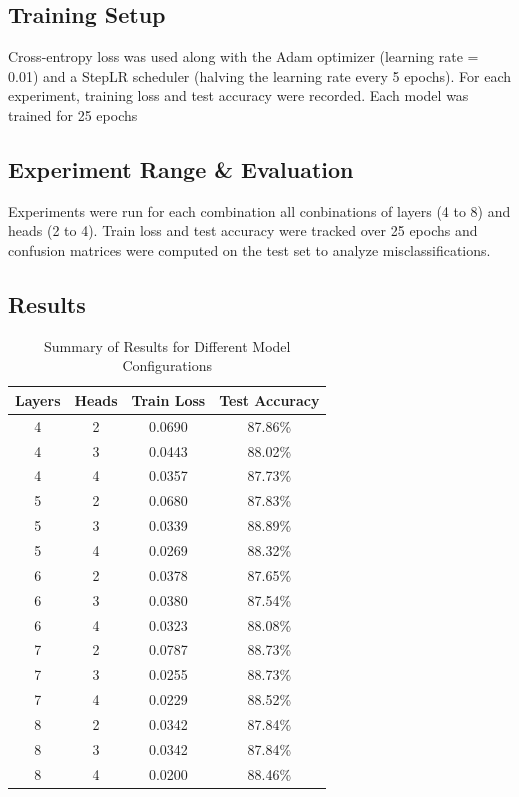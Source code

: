\documentclass{article}
\begin{document}
\subsection*{Training Setup}
Cross-entropy loss was used along with the Adam optimizer (learning rate = 0.01) and a StepLR scheduler (halving the learning rate every 5 epochs). For each experiment, training loss and test accuracy were recorded. Each model was trained for 25 epochs

\subsection*{Experiment Range \& Evaluation}
Experiments were run for each combination all conbinations of layers (4 to 8) and heads (2 to 4). Train loss and test accuracy were tracked over 25 epochs and confusion matrices were computed on the test set to analyze misclassifications. 

\newpage
\subsection*{Results}

\begin{table}[ht]
    \centering
    \begin{tabular}{|c|c|c|c|}
        \hline
        \textbf{Layers} & \textbf{Heads} & \textbf{Train Loss} & \textbf{Test Accuracy} \\
        \hline
        4 & 2 & 0.0690 & 87.86\% \\
        4 & 3 & 0.0443 & 88.02\% \\
        4 & 4 & 0.0357 & 87.73\% \\
        \hline
        5 & 2 & 0.0680 & 87.83\% \\
        5 & 3 & 0.0339 & 88.89\% \\
        5 & 4 & 0.0269 & 88.32\% \\
        \hline
        6 & 2 & 0.0378 & 87.65\% \\
        6 & 3 & 0.0380 & 87.54\% \\
        6 & 4 & 0.0323 & 88.08\% \\
        \hline
        7 & 2 & 0.0787 & 88.73\% \\
        7 & 3 & 0.0255 & 88.73\% \\
        7 & 4 & 0.0229 & 88.52\% \\
        \hline
        8 & 2 & 0.0342 & 87.84\% \\
        8 & 3 & 0.0342 & 87.84\% \\
        8 & 4 & 0.0200 & 88.46\% \\
        \hline
    \end{tabular}
    \caption{Summary of Results for Different Model Configurations}
    \label{tab:results}
\end{table}
\end{document}
